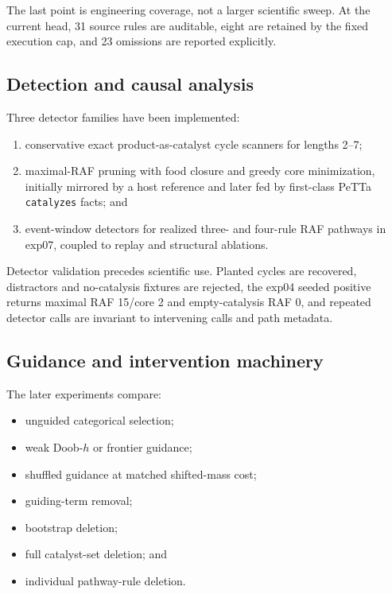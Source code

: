 \documentclass[11pt]{article}
\newcommand{\code}[1]{\texttt{#1}}
\begin{document}
The last point is engineering coverage, not a larger scientific sweep.  At the
current head, 31 source rules are auditable, eight are retained by the fixed
execution cap, and 23 omissions are reported explicitly.

\subsection{Detection and causal analysis}

Three detector families have been implemented:

\begin{enumerate}
\item conservative exact product-as-catalyst cycle scanners for lengths 2--7;
\item maximal-RAF pruning with food closure and greedy core minimization,
      initially mirrored by a host reference and later fed by first-class
      PeTTa \code{catalyzes} facts; and
\item event-window detectors for realized three- and four-rule RAF pathways in
      exp07, coupled to replay and structural ablations.
\end{enumerate}

Detector validation precedes scientific use.  Planted cycles are recovered,
distractors and no-catalysis fixtures are rejected, the exp04 seeded positive
returns maximal RAF 15/core 2 and empty-catalysis RAF 0, and repeated detector
calls are invariant to intervening calls and path metadata.

\subsection{Guidance and intervention machinery}

The later experiments compare:

\begin{itemize}
\item unguided categorical selection;
\item weak Doob-$h$ or frontier guidance;
\item shuffled guidance at matched shifted-mass cost;
\item guiding-term removal;
\item bootstrap deletion;
\item full catalyst-set deletion; and
\item individual pathway-rule deletion.
\end{itemize}
\end{document}
